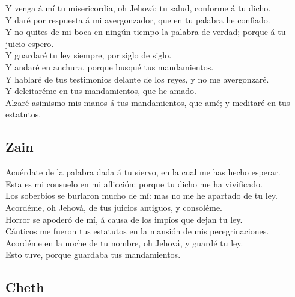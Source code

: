 Y venga á mí tu misericordia, oh Jehová; tu salud,
conforme á tu dicho.\\
 Y daré por respuesta á mi avergonzador, que en tu palabra
he confiado.\\
 Y no quites de mi boca en ningún tiempo la palabra de
verdad; porque á tu juicio espero.\\
 Y guardaré tu ley siempre, por siglo de siglo.\\
 Y andaré en anchura, porque busqué tus mandamientos.\\
 Y hablaré de tus testimonios delante de los reyes, y no me
avergonzaré.\\
 Y deleitaréme en tus mandamientos, que he amado.\\
 Alzaré asimismo mis manos á tus mandamientos, que amé; y
meditaré en tus estatutos.

\hypertarget{zain}{%
\subsection{Zain}\label{zain}}

 Acuérdate de la palabra dada á tu siervo, en la cual me
has hecho esperar.\\
 Esta es mi consuelo en mi aflicción: porque tu dicho me ha
vivificado.\\
 Los soberbios se burlaron mucho de mí: mas no me he
apartado de tu ley.\\
 Acordéme, oh Jehová, de tus juicios antiguos, y
consoléme.\\
 Horror se apoderó de mí, á causa de los impíos que dejan
tu ley.\\
 Cánticos me fueron tus estatutos en la mansión de mis
peregrinaciones.\\
 Acordéme en la noche de tu nombre, oh Jehová, y guardé tu
ley.\\
 Esto tuve, porque guardaba tus mandamientos.

\hypertarget{cheth}{%
\subsection{Cheth}\label{cheth}}

